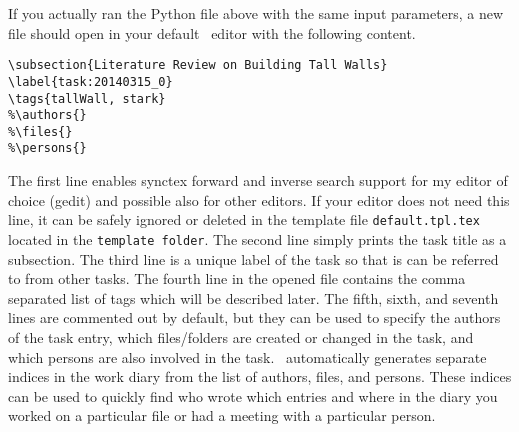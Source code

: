 If you actually ran the Python file above with the same input parameters, a new file should open in your default \LaTeXe\ editor with the following content.
\begin{lstlisting}[language={[LaTeX]TeX}]
% mainfile: ../../../../master.tex
\subsection{Literature Review on Building Tall Walls}
\label{task:20140315_0}
\tags{tallWall, stark}
%\authors{}
%\files{}
%\persons{}
\end{lstlisting}
The first line enables synctex forward and inverse search support for my editor of choice (gedit) and possible also for other editors. If your editor does not need this line, it can be safely ignored or deleted in the template file {\tt default.tpl.tex} located in the {\tt template folder}. The second line simply prints the task title as a subsection. The third line is a unique label of the task so that is can be referred to from other tasks. The fourth line in the opened file contains the comma separated list of tags which will be described later. The fifth, sixth, and seventh lines are commented out by default, but they can be used to specify the authors of the task entry, which files/folders are created or changed in the task, and which persons are also involved in the task. \LaTeXe\ automatically generates separate indices in the work diary from the list of authors, files, and persons. These indices can be used to quickly find who wrote which entries and where in the diary you worked on a particular file or had a meeting with a particular person.


